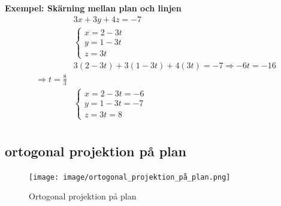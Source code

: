 \begin{multicols}{2}
\textbf{Exempel: Skärning mellan plan och linjen} %
\begin{align*} %
  &3x+3y+4z=-7 \\
  &\left\{\begin{array}{r}
  x = 2-3t \\
  y = 1-3t \\
  z = 3t
  \end{array}\right. \\
  &3(2- 3t)+3(1 -3t)+4(3t)=-7 \Rightarrow -6t=-16  \\
  \Rightarrow t=\frac{8}{3} \\
  &\left\{\begin{array}{r}
  x = 2-3t = -6 \\
  y = 1-3t = -7 \\
  z = 3t = 8 
  \end{array}\right. \\
\end{align*}


\subsection{ortogonal projektion på plan}
\begin{figure}[H]
    \centering
    \texttt{[image: image/ortogonal\_projektion\_på\_plan.png]} 
    \caption{Ortogonal projektion på plan}
\end{figure}


\end{multicols}
